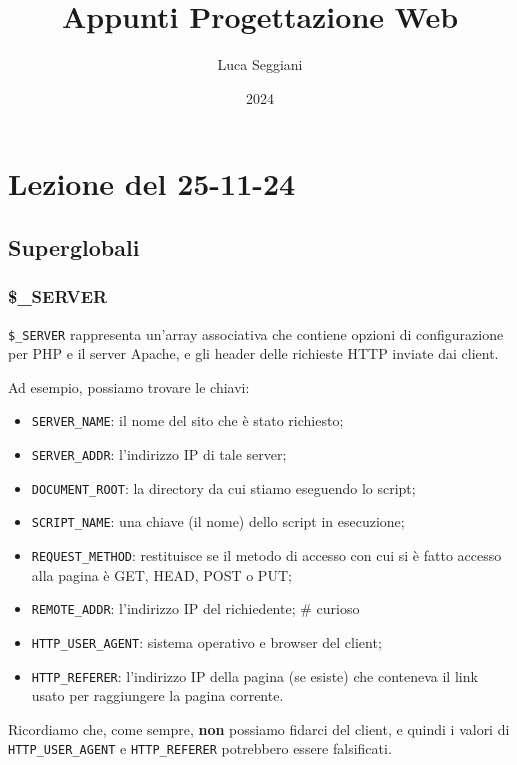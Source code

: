 \documentclass[a4paper,11pt]{article}
\title{Appunti Progettazione Web}
\author{Luca Seggiani}
\date{2024}
\begin{document}
\section{Lezione del 25-11-24}

\thispagestyle{empty}
\pagestyle{fancy}

\lstset{style=codestyle, language=php}

\TODO %

\subsection{Superglobali}

\subsubsection{\$\_SERVER}

\lstinline|$_SERVER| rappresenta un'array associativa che contiene opzioni di configurazione per PHP e il server Apache, e gli header delle richieste HTTP inviate dai client.

Ad esempio, possiamo trovare le chiavi:
\begin{itemize}
	\item \lstinline|SERVER_NAME|: il nome del sito che è stato richiesto; 
	\item \lstinline|SERVER_ADDR|: l'indirizzo IP di tale server; 
	\item \lstinline|DOCUMENT_ROOT|: la directory da cui stiamo eseguendo lo script; 
	\item \lstinline|SCRIPT_NAME|: una chiave (il nome) dello script in esecuzione;
	\item \lstinline|REQUEST_METHOD|: restituisce se il metodo di accesso con cui si è fatto accesso alla pagina è GET, HEAD, POST o PUT;
	\item \lstinline|REMOTE_ADDR|: l'indirizzo IP del richiedente; # curioso
	\item \lstinline|HTTP_USER_AGENT|: sistema operativo e browser del client; 
	\item \lstinline|HTTP_REFERER|: l'indirizzo IP della pagina (se esiste) che conteneva il link usato per raggiungere la pagina corrente.
\end{itemize}

Ricordiamo che, come sempre, \textbf{non} possiamo fidarci del client, e quindi i valori di \lstinline|HTTP_USER_AGENT| e \lstinline|HTTP_REFERER| potrebbero essere falsificati.
\end{document}
